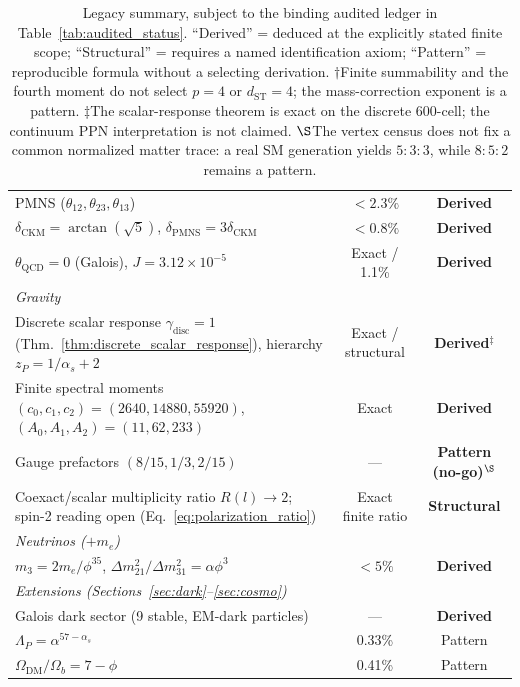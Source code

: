 \documentclass[12pt,a4paper]{article}
\theoremstyle{definition}
\begin{document}
\begin{table}[H]
\begin{tabular}{lcc}
PMNS ($\theta_{12}, \theta_{23}, \theta_{13}$) & $<2.3\%$ & \textbf{Derived} \\
$\delta_{\text{CKM}} = \arctan(\sqrt{5})$, $\delta_{\text{PMNS}} = 3\delta_{\text{CKM}}$ & $<0.8\%$ & \textbf{Derived} \\
$\theta_{\text{QCD}} = 0$ (Galois), $J = 3.12 \times 10^{-5}$ & Exact / 1.1\% & \textbf{Derived} \\
\midrule
\multicolumn{3}{l}{\textit{Gravity}} \\
Discrete scalar response $\gamma_{\mathrm{disc}} = 1$ (Thm.~\ref{thm:discrete_scalar_response}), hierarchy $z_P = 1/\alpha_s + 2$ & Exact / structural & \textbf{Derived}$^\ddagger$ \\
Finite spectral moments $(c_0,c_1,c_2) = (2640,14880,55920)$, $(A_0,A_1,A_2) = (11,62,233)$ & Exact & \textbf{Derived} \\
Gauge prefactors $(8/15,1/3,2/15)$ & --- & \textbf{Pattern (no-go)}$^\S$ \\
Coexact/scalar multiplicity ratio $R(l)\to2$; spin-2 reading open (Eq.~\ref{eq:polarization_ratio}) & Exact finite ratio & \textbf{Structural} \\
\midrule
\multicolumn{3}{l}{\textit{Neutrinos ($+m_e$)}} \\
$m_3 = 2m_e/\phi^{35}$, $\Delta m^2_{21}/\Delta m^2_{31} = \alpha\phi^3$ & $<5\%$ & \textbf{Derived} \\
\midrule
\multicolumn{3}{l}{\textit{Extensions (Sections~\ref{sec:dark}--\ref{sec:cosmo})}} \\
Galois dark sector (9 stable, EM-dark particles) & --- & \textbf{Derived} \\
$\Lambda_P = \alpha^{57-\alpha_s}$ & 0.33\% & Pattern \\
$\Omega_{\text{DM}}/\Omega_b = 7 - \phi$ & 0.41\% & Pattern \\
\bottomrule
\end{tabular}
\caption[Summary of predictions.]{Legacy summary, subject to the binding audited ledger in Table~\ref{tab:audited_status}.  ``Derived'' = deduced at the explicitly stated finite scope; ``Structural'' = requires a named identification axiom; ``Pattern'' = reproducible formula without a selecting derivation.  $\dagger$Finite summability and the fourth moment do not select $p=4$ or $d_{\mathrm{ST}}=4$; the mass-correction exponent is a pattern.  $\ddagger$The scalar-response theorem is exact on the discrete 600-cell; the continuum PPN interpretation is not claimed.  $\S$The vertex census does not fix a common normalized matter trace: a real SM generation yields $5:3:3$, while $8:5:2$ remains a pattern.}
\label{tab:summary}
\end{table}
\end{document}
